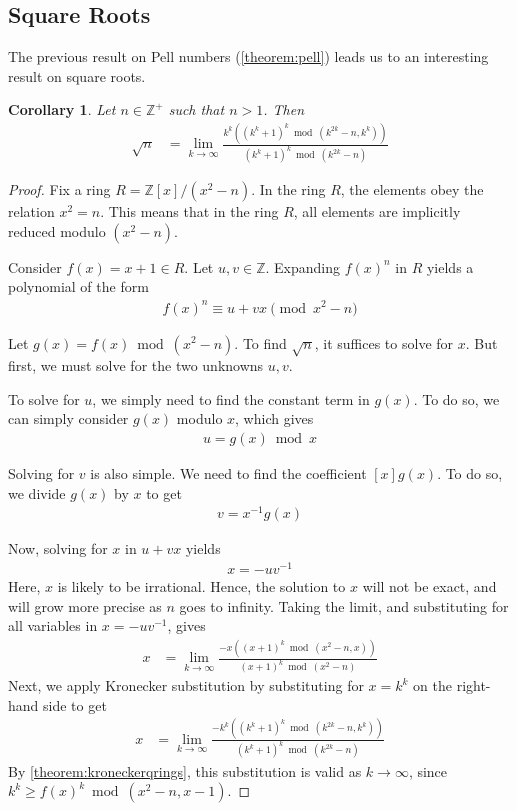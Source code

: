 \documentclass[11pt,reqno]{article}
\theoremstyle{plain}
\newtheorem{corollary}[theorem]{Corollary}
\theoremstyle{definition}
\begin{document}
\subsection{Square Roots}
The previous result on Pell numbers (\cref{theorem:pell}) leads us to an interesting result on square roots.

\begin{corollary} \label{corollary:squareroots}
Let $n \in \mathbb{Z}^+$ such that $n > 1$. Then
\begin{align*}
\sqrt{n} &= \lim_{k\rightarrow\infty}
    \frac{k^k ((k^k + 1)^k \bmod{(k^{2k}-n, k^k)})}
        {(k^k + 1)^k \bmod{(k^{2k}-n)}}
\end{align*}
\end{corollary}
\begin{proof}
Fix a ring $R = \mathbb{Z}[x]/(x^2 - n)$. In the ring $R$, the elements obey the relation $x^2 = n$. This means that in the ring $R$, all elements are implicitly reduced modulo $(x^2 - n)$.

Consider $f(x) = x+1 \in R$. Let $u,v \in \mathbb{Z}$. Expanding $f(x)^n$ in $R$ yields a polynomial of the form
\begin{align*}
f(x)^n \equiv u + v x \pmod{x^2 - n}
\end{align*}

Let $g(x) = f(x) \bmod{(x^2-n)}$. To find $\sqrt{n}$, it suffices to solve for $x$. But first, we must solve for the two unknowns $u,v$.

To solve for $u$, we simply need to find the constant term in $g(x)$. To do so, we can simply consider $g(x)$ modulo $x$, which gives
\begin{align*}
u = g(x) \bmod{x}
\end{align*}

Solving for $v$ is also simple. We need to find the coefficient $[x] g(x)$. To do so, we divide $g(x)$ by $x$ to get
\begin{align*}
v = x^{-1} g(x)
\end{align*}

Now, solving for $x$ in $u + v x$ yields
\begin{align*}
x = -u v^{-1}
\end{align*}
Here, $x$ is likely to be irrational. Hence, the solution to $x$ will not be exact, and will grow more precise as $n$ goes to infinity. Taking the limit, and substituting for all variables in $x = -u v^{-1}$, gives
\begin{align*}
x &= \lim_{k\rightarrow\infty}
    \frac{-x ((x + 1)^k \bmod{(x^{2}-n, x)})}
        {(x + 1)^k \bmod{(x^{2}-n)}}
\end{align*}
Next, we apply Kronecker substitution by substituting for $x = k^k$ on the right-hand side to get
\begin{align*}
x &= \lim_{k\rightarrow\infty}
    \frac{-k^k ((k^k + 1)^k \bmod{(k^{2k}-n, k^k)})}
        {(k^k + 1)^k \bmod{(k^{2k}-n)}}
\end{align*}
By \cref{theorem:kroneckerqrings}, this substitution is valid as $k\rightarrow\infty$, since $k^k \geq f(x)^k \bmod{(x^2-n,x-1)}$.


\end{proof}
\end{document}
